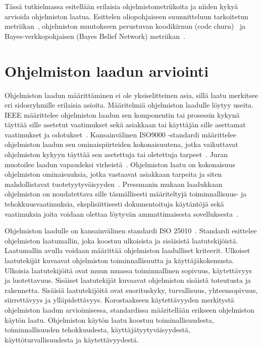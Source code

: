 \documentclass[finnish]{tktltiki2}
\theoremstyle{definition}
\theoremstyle{remark}
\begin{document}
Tässä tutkielmassa esitellään erilaisia ohjelmistometriikoita ja niiden kykyä arvioida ohjelmiston laatua. Esittelen oliopohjaiseen suunnitteluun tarkoitetun metriikan~\cite{CK91, CK94}, ohjelmiston muutokseen perustuvan koodikirnun (code churn)~\cite{NB05} ja Bayes-verkkopohjaisen (Bayes Belief Network) metriikan~\cite{FNMHMKM07}.

\newpage

\section{Ohjelmiston laadun arviointi}

Ohjelmiston laadun määrittäminen ei ole yksiselitteinen asia, sillä laatu merkitsee eri sidosryhmille erilaisia asioita. Määritelmiä ohjelmiston laadulle löytyy useita. IEEE määrittelee ohjelmiston laadun sen komponentin tai prosessin kykynä täyttää sille asetetut vaatimukset sekä asiakkaan tai käyttäjän sille asettamat vaatimukset ja odotukset~\cite{IEEE90}. Kansainvälinen ISO9000 -standardi määrittelee ohjelmiston laadun sen ominaispiirteiden kokonaisuutena, jotka vaikuttavat ohjelmiston kykyyn täyttää sen asetettuja tai oletettuja tarpeet~\cite{ISO9000, MD06}. Juran muotoilee laadun vapaudeksi virheistä~\cite{JGB74}. Ohjelmiston laatu on kokonaisuus ohjelmiston ominaisuuksia, jotka vastaavat asiakkaan tarpeita ja siten mahdollistavat tuotetyytyväisyyden~\cite{JGB74}. Pressmanin mukaan laadukkaan ohjelmiston on noudatettava sille täsmällisesti määriteltyjä toiminnallisuus- ja tehokkuusvaatimuksia, eksplisiittisesti dokumentoituja käytäntöjä sekä vaatimuksia joita voidaan olettaa löytyvän ammattimaisesta sovelluksesta~\cite{PI92}.

Ohjelmiston laadulle on kansainvälinen standardi ISO 25010~\cite{ISO25010}. Standardi esittelee ohjelmiston laatumallin, joka koostuu ulkoisista ja sisäisistä laatutekijöistä. Laatumallin avulla voidaan määrittää ohjelmiston laadulliset kriteerit. Ulkoiset laatutekijät kuvaavat ohjelmiston toiminnallisuutta ja käyttäjäkokemusta. Ulkoisia laatutekijöitä ovat muun muassa toiminnallinen sopivuus, käytettävyys ja luotettavuus. Sisäiset laatutekijät kuvaavat ohjelmiston sisäistä toteutusta ja rakennetta. Sisäisiä laatutekijöitä ovat suorituskyky, turvallisuus, yhteensopivuus, siirrettävyys ja ylläpidettävyys. Korostaakseen käytettävyyden merkitystä ohjelmiston laadun arvioimisessa, standardissa määritellään erikseen ohjelmiston käytön laatu. Ohjelmiston käytön laatu koostuu toiminallisuudesta, toiminnallisuuden tehokkuudesta, käyttäjätyytyväisyydestä, käyttöturvallisuudesta ja käytettävyydestä.
\end{document}
